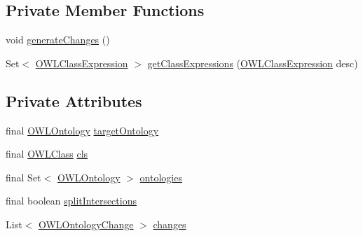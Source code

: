 \subsection*{Private Member Functions}
\begin{DoxyCompactItemize}
\item 
void \hyperlink{classorg_1_1semanticweb_1_1owlapi_1_1_convert_equivalent_classes_to_super_classes_a44a6de6df7b6b99ba461f7c3ce84c3ef}{generate\-Changes} ()
\item 
Set$<$ \hyperlink{interfaceorg_1_1semanticweb_1_1owlapi_1_1model_1_1_o_w_l_class_expression}{O\-W\-L\-Class\-Expression} $>$ \hyperlink{classorg_1_1semanticweb_1_1owlapi_1_1_convert_equivalent_classes_to_super_classes_ab29b1228abb90b464d0e037cbbb2180c}{get\-Class\-Expressions} (\hyperlink{interfaceorg_1_1semanticweb_1_1owlapi_1_1model_1_1_o_w_l_class_expression}{O\-W\-L\-Class\-Expression} desc)
\end{DoxyCompactItemize}
\subsection*{Private Attributes}
\begin{DoxyCompactItemize}
\item 
final \hyperlink{interfaceorg_1_1semanticweb_1_1owlapi_1_1model_1_1_o_w_l_ontology}{O\-W\-L\-Ontology} \hyperlink{classorg_1_1semanticweb_1_1owlapi_1_1_convert_equivalent_classes_to_super_classes_ac3c217dfc21f6996f8c786eeb178afed}{target\-Ontology}
\item 
final \hyperlink{interfaceorg_1_1semanticweb_1_1owlapi_1_1model_1_1_o_w_l_class}{O\-W\-L\-Class} \hyperlink{classorg_1_1semanticweb_1_1owlapi_1_1_convert_equivalent_classes_to_super_classes_af9d487e4ebdce59f98f4c7366c4ce12c}{cls}
\item 
final Set$<$ \hyperlink{interfaceorg_1_1semanticweb_1_1owlapi_1_1model_1_1_o_w_l_ontology}{O\-W\-L\-Ontology} $>$ \hyperlink{classorg_1_1semanticweb_1_1owlapi_1_1_convert_equivalent_classes_to_super_classes_a30397ac9b4353db06705cc1585b235cd}{ontologies}
\item 
final boolean \hyperlink{classorg_1_1semanticweb_1_1owlapi_1_1_convert_equivalent_classes_to_super_classes_addb6f40f0ea084faa384ce22690b17c0}{split\-Intersections}
\item 
List$<$ \hyperlink{classorg_1_1semanticweb_1_1owlapi_1_1model_1_1_o_w_l_ontology_change}{O\-W\-L\-Ontology\-Change} $>$ \hyperlink{classorg_1_1semanticweb_1_1owlapi_1_1_convert_equivalent_classes_to_super_classes_af697f6745c357549fd89106fc1fc9272}{changes}
\end{DoxyCompactItemize}
